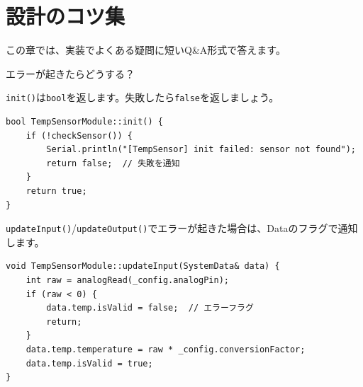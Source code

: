 \section{設計のコツ集}

この章では、実装でよくある疑問に短いQ\&A形式で答えます。

\begin{qabox}{エラーが起きたらどうする？}

\texttt{init()}は\texttt{bool}を返します。失敗したら\texttt{false}を返しましょう。

\begin{lstlisting}
bool TempSensorModule::init() {
    if (!checkSensor()) {
        Serial.println("[TempSensor] init failed: sensor not found");
        return false;  // 失敗を通知
    }
    return true;
}
\end{lstlisting}

\texttt{updateInput()}/\texttt{updateOutput()}でエラーが起きた場合は、Dataのフラグで通知します。

\begin{lstlisting}
void TempSensorModule::updateInput(SystemData& data) {
    int raw = analogRead(_config.analogPin);
    if (raw < 0) {
        data.temp.isValid = false;  // エラーフラグ
        return;
    }
    data.temp.temperature = raw * _config.conversionFactor;
    data.temp.isValid = true;
}
\end{lstlisting}

\end{qabox}

